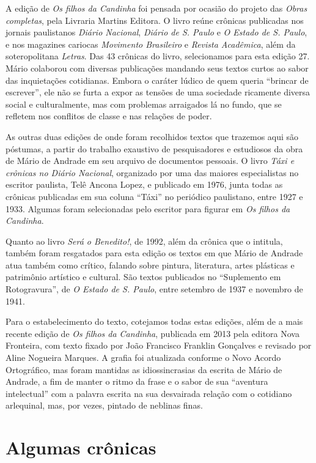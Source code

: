 A edição de \emph{Os filhos da Candinha} foi pensada por ocasião do
projeto das \emph{Obras completas}, pela Livraria Martins Editora. O
livro reúne crônicas publicadas nos jornais paulistanos \emph{Diário
Nacional}, \emph{Diário de S. Paulo} e \emph{O Estado de S. Paulo}, e
nos magazines cariocas \emph{Movimento Brasileiro} e \emph{Revista
Acadêmica}, além da soteropolitana \emph{Letras}. Das 43 crônicas do
livro, selecionamos para esta edição 27. Mário colaborou com diversas
publicações mandando seus textos curtos ao sabor das inquietações
cotidianas. Embora o caráter lúdico de quem queria ``brincar de
escrever'', ele não se furta a expor as tensões de uma sociedade
ricamente diversa social e culturalmente, mas com problemas arraigados
lá no fundo, que se refletem nos conflitos de classe e nas relações de
poder.

As outras duas edições de onde foram recolhidos textos que trazemos aqui
são póstumas, a partir do trabalho exaustivo de pesquisadores e
estudiosos da obra de Mário de Andrade em seu arquivo de documentos
pessoais. O livro \emph{Táxi e crônicas no Diário Nacional}, organizado
por uma das maiores especialistas no escritor paulista, Telê Ancona
Lopez, e publicado em 1976, junta todas as crônicas publicadas em sua
coluna ``Táxi'' no periódico paulistano, entre 1927 e 1933. Algumas
foram selecionadas pelo escritor para figurar em \emph{Os filhos da
Candinha}.

Quanto ao livro \emph{Será o Benedito!}, de 1992, além da crônica que o
intitula, também foram resgatados para esta edição os textos em que
Mário de Andrade atua também como crítico, falando sobre pintura,
literatura, artes plásticas e patrimônio artístico e cultural. São
textos publicados no ``Suplemento em Rotogravura'', de \emph{O Estado de
S. Paulo}, entre setembro de 1937 e novembro de 1941.

Para o estabelecimento do texto, cotejamos todas estas edições, além de
a mais recente edição de \emph{Os filhos da Candinha}, publicada em 2013
pela editora Nova Fronteira, com texto fixado por João Francisco
Franklin Gonçalves e revisado por Aline Nogueira Marques. A grafia foi
atualizada conforme o Novo Acordo Ortográfico, mas foram mantidas as
idiossincrasias da escrita de Mário de Andrade, a fim de manter o ritmo
da frase e o sabor de sua ``aventura intelectual'' com a palavra escrita
na sua desvairada relação com o cotidiano arlequinal, mas, por vezes,
pintado de neblinas finas.

\part{Algumas crônicas}

